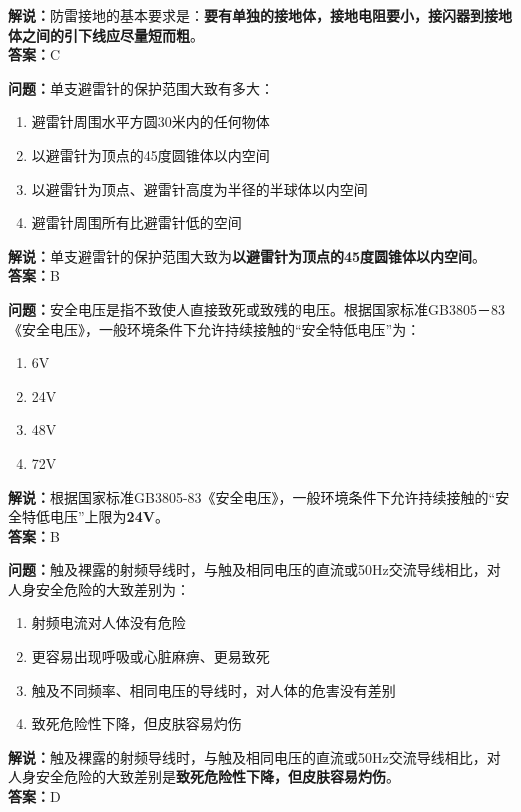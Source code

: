 \noindent\textbf{解说：}防雷接地的基本要求是：\textbf{要有单独的接地体，接地电阻要小，接闪器到接地体之间的引下线应尽量短而粗}。\\\noindent\textbf{答案：}C%


\bigskip


\noindent\textbf{问题：}单支避雷针的保护范围大致有多大：

\begin{enumerate}[label=\Alph*), leftmargin=3em]
	\item 避雷针周围水平方圆30米内的任何物体
	\item 以避雷针为顶点的45度圆锥体以内空间
	\item 以避雷针为顶点、避雷针高度为半径的半球体以内空间
	\item 避雷针周围所有比避雷针低的空间
\end{enumerate}

\noindent\textbf{解说：}单支避雷针的保护范围大致为\textbf{以避雷针为顶点的45度圆锥体以内空间}。\\\noindent\textbf{答案：}B%


\bigskip


\noindent\textbf{问题：}安全电压是指不致使人直接致死或致残的电压。根据国家标准GB3805－83《安全电压》，一般环境条件下允许持续接触的“安全特低电压”为：

\begin{enumerate}[label=\Alph*), leftmargin=3em]
	\item 6V
	\item 24V
	\item 48V
	\item 72V
\end{enumerate}

\noindent\textbf{解说：}根据国家标准GB3805-83《安全电压》，一般环境条件下允许持续接触的“安全特低电压”上限为\textbf{24V}。\\\noindent\textbf{答案：}B%


\bigskip


\noindent\textbf{问题：}触及裸露的射频导线时，与触及相同电压的直流或50Hz交流导线相比，对人身安全危险的大致差别为：
\begin{enumerate}[label=\Alph*), leftmargin=3em]
	\item 射频电流对人体没有危险
	\item 更容易出现呼吸或心脏麻痹、更易致死
	\item 触及不同频率、相同电压的导线时，对人体的危害没有差别
	\item 致死危险性下降，但皮肤容易灼伤
\end{enumerate}
\noindent\textbf{解说：}触及裸露的射频导线时，与触及相同电压的直流或50Hz交流导线相比，对人身安全危险的大致差别是\textbf{致死危险性下降，但皮肤容易灼伤}。\\\noindent\textbf{答案：}D

